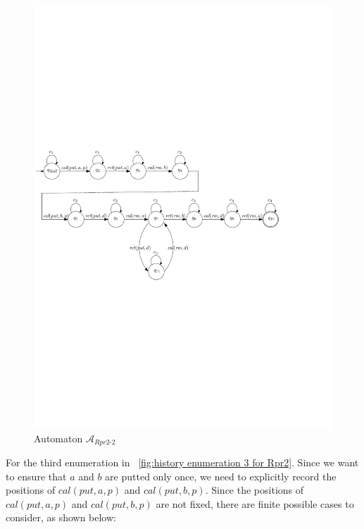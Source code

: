\documentclass{llncs}
\begin{document}
\begin{figure}[htbp]
  \centering
  \includegraphics[width=0.8 \textwidth]{PIC_AUTO_Rpr2_2.pdf}
  \caption{Automaton $\mathcal{A}_{\textit{Rpr2-2}}$}
  \label{fig:automata for second enumeration of Rpr2}
\end{figure}

For the third enumeration in \figurename~\ref{fig:history enumeration 3 for Rpr2}. Since we want to ensure that $a$ and $b$ are putted only once, we need to explicitly record the positions of $\textit{cal}(\textit{put},a,p)$ and $\textit{cal}(\textit{put},b,p)$. Since the positions of $\textit{cal}(\textit{put},a,p)$ and $\textit{cal}(\textit{put},b,p)$ are not fixed, there are finite possible cases to consider, as shown below:
\end{document}
